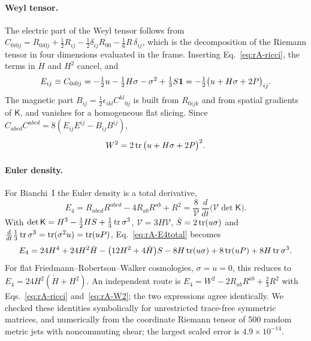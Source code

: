 \paragraph{Weyl tensor.}
The electric part of the Weyl tensor follows from $C_{0i0j}=R_{0i0j}+\tfrac12R_{ij}-\tfrac12\delta_{ij}R_{00}-\tfrac16R\,\delta_{ij}$, which is the decomposition of the Riemann tensor in four dimensions evaluated in the frame.
Inserting Eq.~\eqref{eq:rA-ricci}, the terms in $\dot H$ and $H^2$ cancel, and
\begin{equation}
E_{ij}\equiv C_{0i0j}=-\tfrac12u-\tfrac12H\sigma-\sigma^2+\tfrac13S\mathbf{1}=-\tfrac12\big(u+H\sigma+2P\big)_{ij}.
\label{eq:rA-electric}
\end{equation}
The magnetic part $B_{ij}=\tfrac12\epsilon_{ikl}C^{kl}{}_{0j}$ is built from $R_{0ijk}$ and from spatial gradients of $\mathsf K$, and vanishes for a homogeneous flat slicing.
Since $C_{abcd}C^{abcd}=8(E_{ij}E^{ij}-B_{ij}B^{ij})$,
\begin{equation}
W^2=2\operatorname{tr}\big(u+H\sigma+2P\big)^2 .
\label{eq:rA-W2}
\end{equation}

\paragraph{Euler density.}
For Bianchi~I the Euler density is a total derivative,
\begin{equation}
E_4=R_{abcd}R^{abcd}-4R_{ab}R^{ab}+R^2=\frac{8}{\mathcal V}\,\frac{d}{dt}\big(\mathcal V\det\mathsf K\big).
\label{eq:rA-E4total}
\end{equation}
With $\det\mathsf K=H^3-\tfrac12HS+\tfrac13\operatorname{tr}\sigma^3$, $\dot{\mathcal V}=3H\mathcal V$, $\dot S=2\operatorname{tr}(u\sigma)$ and $\tfrac{d}{dt}\tfrac13\operatorname{tr}\sigma^3=\operatorname{tr}(\sigma^2u)=\operatorname{tr}(uP)$, Eq.~\eqref{eq:rA-E4total} becomes
\begin{equation}
E_4=24H^4+24H^2\dot H-\big(12H^2+4\dot H\big)S-8H\operatorname{tr}(u\sigma)+8\operatorname{tr}(uP)+8H\operatorname{tr}\sigma^3 .
\label{eq:rA-E4}
\end{equation}
For flat Friedmann--Robertson--Walker cosmologies, $\sigma=u=0$, this reduces to $E_4=24H^2(\dot H+H^2)$.
An independent route is $E_4=W^2-2R_{ab}R^{ab}+\tfrac23R^2$ with Eqs.~\eqref{eq:rA-ricci} and~\eqref{eq:rA-W2}; the two expressions agree identically.
We checked these identities symbolically for unrestricted trace-free symmetric matrices, and numerically from the coordinate Riemann tensor of 500 random metric jets with noncommuting shear; the largest scaled error is $4.9\times10^{-14}$. %

